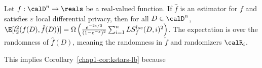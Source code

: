 \begin{theorem}
\label{chap1-thm:lb-local}
  Let $f : \calD^n \rightarrow \reals$ be a real-valued function. If $\hat{f}$ is
  an estimator for $f$ and satisfies $\varepsilon$ local differential privacy,
  then for all $D \in \calD^n$, 
  $\E[l_2^2(f(D), \hat{f}(D))] =
  \Omega\left(\frac{e^{-2\varepsilon/3}}{(1-e^{-\varepsilon})^2} \sum_{i=1}^n
  LS_f^{loc}(D,i)^2\right)$.
  The expectation is over the randomness of $\hat{f}(D)$, meaning the
  randomness in $\tilde{f}$ and randomizers $\calR_i$.
\end{theorem}

This implies Corollary~\ref{chap1-cor:kstars-lb} because
